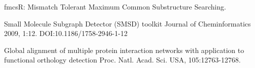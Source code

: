 \documentclass[DIV=calc, paper=a4, fontsize=12pt, twocolumn]{scrartcl}	 %
\begin{document}
\begin{thebibliography}{99} %

\newblock fmcsR: Mismatch Tolerant Maximum Common Substructure Searching. 

\newblock Small Molecule Subgraph Detector (SMSD) toolkit
\newblock Journal of Cheminformatics 2009, 1:12. DOI:10.1186/1758-2946-1-12

\newblock Global alignment of multiple protein interaction networks with application to functional orthology detection
\newblock Proc. Natl. Acad. Sci. USA, 105:12763-12768.
\end{thebibliography}

\end{document}
